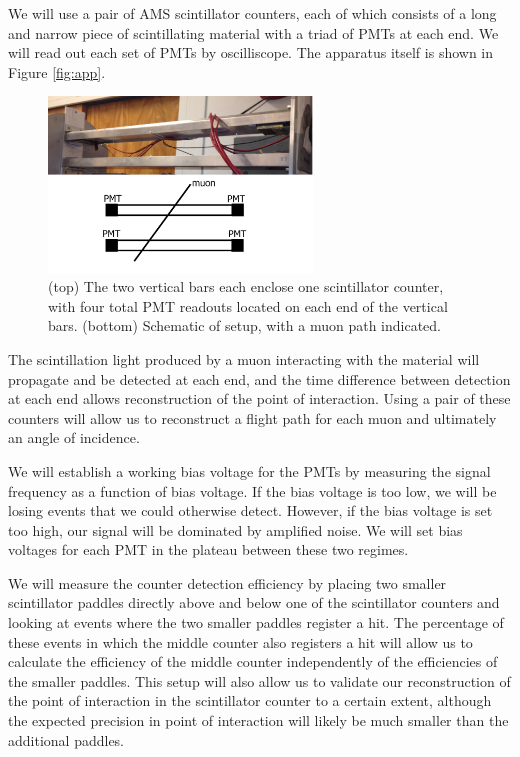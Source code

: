 We will use a pair of AMS scintillator counters, each of which consists of a long and narrow piece of scintillating material with a triad of PMTs at each end. We will read out each set of PMTs by oscilliscope. The apparatus itself is shown in Figure \ref{fig:app}.

\begin{figure}[htb]
\includegraphics[width=7cm]{apparatus2.JPG}
\caption{(top) The two vertical bars each enclose one scintillator counter, with four total PMT readouts located on each end of the vertical bars. (bottom) Schematic of setup, with a muon path indicated. }
\label{fig:apparatus}
\end{figure}

The scintillation light produced by a muon interacting with the material will propagate and be detected at each end, and the time difference between detection at each end allows reconstruction of the point of interaction. Using a pair of these counters will allow us to reconstruct a flight path for each muon and ultimately an angle of incidence.

We will establish a working bias voltage for the PMTs by measuring the signal frequency as a function of bias voltage. If the bias voltage is too low, we will be losing events that we could otherwise detect. However, if the bias voltage is set too high, our signal will be dominated by amplified noise. We will set bias voltages for each PMT in the plateau between these two regimes.

We will measure the counter detection efficiency by placing two smaller scintillator paddles directly above and below one of the scintillator counters and looking at events where the two smaller paddles register a hit. The percentage of these events in which the middle counter also registers a hit will allow us to calculate the efficiency of the middle counter independently of the efficiencies of the smaller paddles. This setup will also allow us to validate our reconstruction of the point of interaction in the scintillator counter to a certain extent, although the expected precision in point of interaction will likely be much smaller than the additional paddles.

